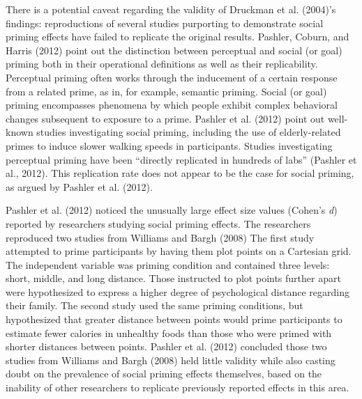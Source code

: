\documentclass[,man]{apa6}
\begin{document}
There is a potential caveat regarding the validity of Druckman et al.
(2004)'s findings: reproductions of several studies purporting to
demonstrate social priming effects have failed to replicate the original
results. Pashler, Coburn, and Harris (2012) point out the distinction
between perceptual and social (or goal) priming both in their
operational definitions as well as their replicability. Perceptual
priming often works through the inducement of a certain response from a
related prime, as in, for example, semantic priming. Social (or goal)
priming encompasses phenomena by which people exhibit complex behavioral
changes subsequent to exposure to a prime. Pashler et al. (2012) point
out well-known studies investigating social priming, including the use
of elderly-related primes to induce slower walking speeds in
participants. Studies investigating perceptual priming have been
\enquote{directly replicated in hundreds of labs} (Pashler et al.,
2012). This replication rate does not appear to be the case for social
priming, as argued by Pashler et al. (2012).

Pashler et al. (2012) noticed the unusually large effect size values
(Cohen's \emph{d}) reported by researchers studying social priming
effects. The researchers reproduced two studies from Williams and Bargh
(2008) The first study attempted to prime participants by having them
plot points on a Cartesian grid. The independent variable was priming
condition and contained three levels: short, middle, and long distance.
Those instructed to plot points further apart were hypothesized to
express a higher degree of psychological distance regarding their
family. The second study used the same priming conditions, but
hypothesized that greater distance between points would prime
participants to estimate fewer calories in unhealthy foods than those
who were primed with shorter distances between points. Pashler et al.
(2012) concluded those two studies from Williams and Bargh (2008) held
little validity while also casting doubt on the prevalence of social
priming effects themselves, based on the inability of other researchers
to replicate previously reported effects in this area.
\end{document}
